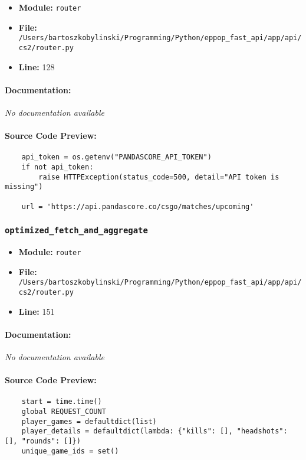 \documentclass[11pt,a4paper]{article}
\begin{document}
\begin{itemize}
    \item \textbf{Module:} \texttt{router}
    \item \textbf{File:} \texttt{/Users/bartoszkobylinski/Programming/Python/eppop\_fast\_api/app/api/cs2/router.py}
    \item \textbf{Line:} 128
\end{itemize}

\paragraph{Documentation:} \textit{No documentation available}

\paragraph{Source Code Preview:}
\begin{verbatim}
    api_token = os.getenv("PANDASCORE_API_TOKEN")
    if not api_token:
        raise HTTPException(status_code=500, detail="API token is missing")

    url = 'https://api.pandascore.co/csgo/matches/upcoming'
\end{verbatim}

\vspace{1em}
\subsubsection{\texttt{optimized\_fetch\_and\_aggregate}}

\begin{itemize}
    \item \textbf{Module:} \texttt{router}
    \item \textbf{File:} \texttt{/Users/bartoszkobylinski/Programming/Python/eppop\_fast\_api/app/api/cs2/router.py}
    \item \textbf{Line:} 151
\end{itemize}

\paragraph{Documentation:} \textit{No documentation available}

\paragraph{Source Code Preview:}
\begin{verbatim}
    start = time.time()
    global REQUEST_COUNT
    player_games = defaultdict(list)
    player_details = defaultdict(lambda: {"kills": [], "headshots": [], "rounds": []})
    unique_game_ids = set()
\end{verbatim}
\end{document}
